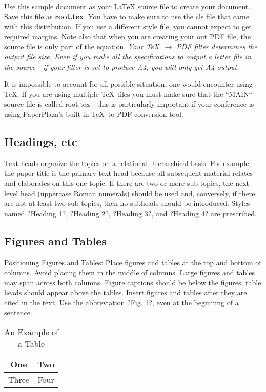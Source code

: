 \documentclass[letterpaper, 10 pt, conference]{ieeeconf}  %
\begin{document}
Use this sample document as your LaTeX source file to create your document. Save this file as {\bf root.tex}. You have to make sure to use the cls file that came with this distribution. If you use a different style file, you cannot expect to get required margins. Note also that when you are creating your out PDF file, the source file is only part of the equation. {\it Your \TeX\ $\rightarrow$ PDF filter determines the output file size. Even if you make all the specifications to output a letter file in the source - if your filter is set to produce A4, you will only get A4 output. }

It is impossible to account for all possible situation, one would encounter using \TeX. If you are using multiple \TeX\ files you must make sure that the ``MAIN`` source file is called root.tex - this is particularly important if your conference is using PaperPlaza's built in \TeX\ to PDF conversion tool.

\subsection{Headings, etc}

Text heads organize the topics on a relational, hierarchical basis. For example, the paper title is the primary text head because all subsequent material relates and elaborates on this one topic. If there are two or more sub-topics, the next level head (uppercase Roman numerals) should be used and, conversely, if there are not at least two sub-topics, then no subheads should be introduced. Styles named ?Heading 1?, ?Heading 2?, ?Heading 3?, and ?Heading 4? are prescribed.

\subsection{Figures and Tables}

Positioning Figures and Tables: Place figures and tables at the top and bottom of columns. Avoid placing them in the middle of columns. Large figures and tables may span across both columns. Figure captions should be below the figures; table heads should appear above the tables. Insert figures and tables after they are cited in the text. Use the abbreviation ?Fig. 1?, even at the beginning of a sentence.

\begin{table}[h]
\caption{An Example of a Table}
\label{table_example}
\begin{center}
\begin{tabular}{|c||c|}
\hline
One & Two\\
\hline
Three & Four\\
\hline
\end{tabular}
\end{center}
\end{table}
\end{document}
